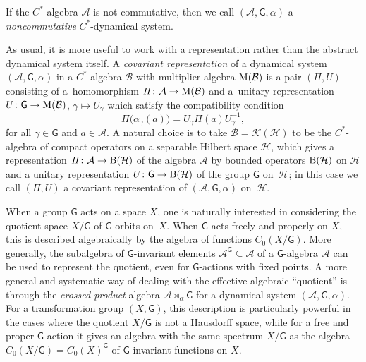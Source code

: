\documentclass[pdftex]{sigma}
\numberwithin{equation}{section}
\newcommand{\CK}{\mathcal{K}}
\newcommand{\sfG}{\mathsf{G}}
\newcommand{\Pim}{{\mathit\Pi}}
\def\alg{{\mathcal A}}
\def\balg{{\mathcal B}}
\def\hil{{\mathcal H}}
\begin{document}
If the $C^*$-algebra $\alg$ is not commutative, then we call
$(\alg,\sfG,\alpha)$ a \emph{noncommutative} $C^*$-dynamical system.

As usual, it is more useful to work with a representation rather than the
abstract dynamical system itself. A \emph{covariant representation} of
a dynamical system $(\alg,\sfG,\alpha)$ in a $C^*$-algebra $\balg$ with
multiplier algebra ${\rm M}(\balg)$ is a
pair $(\Pim,U)$ consisting of a~homomorphism $\Pim\colon \alg\to {\rm M}(\balg)$ and a~unitary representation $U\colon \sfG\to{\rm M}(\balg)$, $\gamma\mapsto U_\gamma$ which satisfy the compatibility condition
\[
\Pim\big(\alpha_\gamma(a)\big) = U_\gamma \Pim(a) U_\gamma^{-1} ,
\]
for all $\gamma\in \sfG$ and $a\in\alg$. A natural choice is to take
$\balg=\CK(\hil)$ to be the $C^*$-algebra of compact operators on a
separable Hilbert space $\hil$, which gives a
representation $\Pim\colon \alg\to{\rm B}(\hil)$ of the algebra $\alg$ by
bounded operators ${\rm B}(\hil)$ on $\hil$ and a unitary representation
$U\colon \sfG\to{\rm B}(\hil)$ of the group $\sfG$ on~$\hil$; in this case
we call $(\Pim,U)$ a covariant representation of $(\alg,\sfG,\alpha)$ on~$\hil$.

When a group $\sfG$ acts on a space $X$, one is naturally interested
in considering the
quotient space $X/\sfG$ of $\sfG$-orbits on~$X$. When $\sfG$ acts
freely and properly on
$X$, this is described algebraically by the algebra of functions
$C_0(X/\sfG)$. More generally, the subalgebra of $\sfG$-invariant elements
$\alg^\sfG\subseteq\alg$ of a $\sfG$-algebra $\alg$ can be used to represent the quotient, even for
$\sfG$-actions with fixed points. A more general and systematic way of
dealing with the effective algebraic ``quotient'' is through the
\emph{crossed product} algebra $\alg\rtimes_\alpha \sfG$ for a dynamical
system $(\alg,\sfG,\alpha)$. For a transformation group $(X,\sfG)$,
this description is particularly powerful in the cases where the
quotient $X/\sfG$ is not a Hausdorff space, while for a free and proper
$\sfG$-action it gives an algebra with the same spectrum $X/\sfG$
as the algebra $C_0(X/\sfG)=C_0(X)^\sfG$ of
$\sfG$-invariant functions on $X$.
\end{document}
